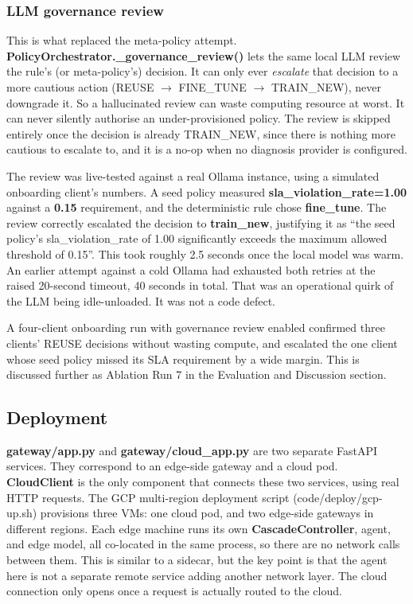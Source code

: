 \hypertarget{llm-governance-review}{%
\subsubsection{LLM governance review}\label{llm-governance-review}}

This is what replaced the meta-policy attempt.
\textbf{PolicyOrchestrator.\_governance\_review()} lets the same local
LLM review the rule's (or meta-policy's) decision. It can only ever
\emph{escalate} that decision to a more cautious action (REUSE $\to$
FINE\_TUNE $\to$ TRAIN\_NEW), never downgrade it. So a hallucinated
review can waste computing resource at worst. It can never silently authorise an
under-provisioned policy. The review is skipped entirely once the
decision is already TRAIN\_NEW, since there is nothing more cautious to
escalate to, and it is a no-op when no diagnosis provider is
configured.

The review was live-tested against a real Ollama instance, using a
simulated onboarding client's numbers. A seed policy measured
\textbf{sla\_violation\_rate=1.00} against a \textbf{0.15} requirement,
and the deterministic rule chose \textbf{fine\_tune}. The review
correctly escalated the decision to \textbf{train\_new}, justifying it
as ``the seed policy's sla\_violation\_rate of 1.00 significantly
exceeds the maximum allowed threshold of 0.15''. This took roughly 2.5
seconds once the local model was warm. An earlier attempt against a
cold Ollama had exhausted both retries at the raised 20-second timeout,
40 seconds in total. That was an
operational quirk of the LLM being idle-unloaded. It was not a code
defect.

A four-client onboarding run with governance review enabled confirmed
three clients' REUSE decisions without wasting compute, and escalated
the one client whose seed policy missed its SLA requirement by
a wide margin. This is discussed further as Ablation Run 7 in the
Evaluation and Discussion section.

\hypertarget{deployment}{%
\subsection{Deployment}\label{deployment}}

\textbf{gateway/app.py} and \textbf{gateway/cloud\_app.py} are two
separate FastAPI services. They correspond to an edge-side gateway and
a cloud pod. \textbf{CloudClient} is the only component that connects
these two services, using real HTTP requests. The GCP multi-region
deployment script (code/deploy/gcp-up.sh) provisions three VMs: one
cloud pod, and two edge-side gateways in different regions. Each edge
machine runs its own \textbf{CascadeController}, agent, and edge model,
all co-located in the same process, so there are no network calls
between them. This is similar to a sidecar, but the key point is that
the agent here is not a separate remote service adding another network
layer. The cloud connection only opens once a request is actually
routed to the cloud.

